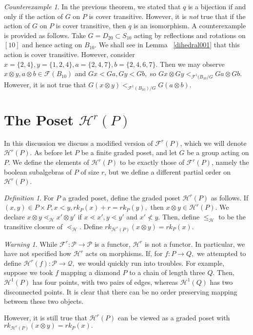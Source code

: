 \documentclass{amsart}
\theoremstyle{remark}
\newtheorem{counterexample}[thm]{Counterexample}
\newtheorem{defn}[thm]{Definition}
\newtheorem{warning}[thm]{Warning}
\begin{document}
\begin{counterexample}
In the previous theorem, we stated that $q$ is a bijection if and only if the action of $G$ on $P$ is cover transitive. However, it is {\it not} true that if the action of $G$ on $P$ is cover transitive, then $q$ is an isomorphism. A counterexample is provided as follows. Take $G=D_{20} \subset S_{10}$ acting by reflections and rotations on $[10]$ and hence acting on $B_{10}.$ We shall see in Lemma ~\ref{dihedral001} that this action is cover transitive. However, consider $x = \{2,4\},y = \{1,2,4\},a = \{2,4,7\},b = \{2,4,6,7\}.$ Then we may observe $x \otimes y,a \otimes b \in \mathcal F(B_{10})$ and $Gx < Ga, Gy < Gb,$ so $Gx \otimes Gy <_{\mathcal F^1(B_{10}/G} Ga \otimes Gb.$ However, it is not true that $G(x\otimes y)<_{\mathcal F^1(B_{10})/G} G(a\otimes b).$
\end{counterexample}

\section{The Poset $\mathcal{H}^r(P)$}
In this discussion we discuss a modified version of $\mathcal{F}^r(P)$, which we will denote $\mathcal{H}^r(P)$.  As before let $P$ be a finite graded poset, and let $G$ be a group acting on $P$.  We define the elements of $\mathcal{H}^r(P)$ to be exactly those of $\mathcal{F}^r(P)$, namely the boolean subalgebras of $P$ of size $r$, but we define a different partial order on $\mathcal{H}^r(P)$.

\begin{defn}
\label{defn:h_map}
For $P$ a graded poset, define the graded poset $\mathcal H^r(P)$ as follows. If $(x,y) \in P\times P,x <y,rk_P(x) + r = rk_P(y),$ then $x \otimes y \in \mathcal H^r(P).$ We declare $x\otimes y \lessdot_{\mathcal H} x' \otimes y'$ if $x \lessdot x',y\lessdot y'$ and $x' \not < y.$ Then, define $\leq_{\mathcal H}$ to be the transitive closure of $\lessdot_{\mathcal H}.$ Define $rk_{\mathcal H^r(P)}(x\otimes y) = rk_P(x).$
\end{defn}

\begin{warning}
While $\mathcal F^r:\mathcal P \rightarrow \mathcal P$ is a functor, $\mathcal H^r$ is not a functor. In particular, we have not specified how $\mathcal H^r$ acts on morphisms. If, for $f:P \rightarrow Q,$ we attempted to define $\mathcal H^r(f):\mathcal P \rightarrow \mathcal Q,$ we would quickly run into troubles. For example, suppose we took $f$ mapping a diamond $P$ to a chain of length three $Q$. Then, $\mathcal H^1(P)$ has four points, with two pairs of edges, whereas $\mathcal H^1(Q)$ has two disconnected points. It is clear that there can be no order preserving mapping between these two objects. 

However, it is still true that $\mathcal H^r(P)$ can be viewed as a graded poset with $rk_{\mathcal H^r(P)}(x\otimes y) = rk_P(x).$
\end{warning}
\end{document}
